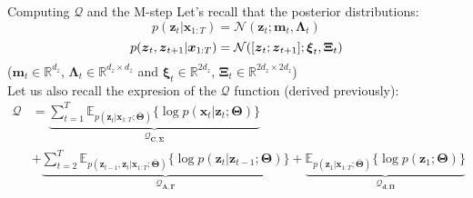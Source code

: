 \documentclass{beamer}
\newcommand{\MN}{{\mathcal N}}
\newcommand{\bs}[1]{\boldsymbol{#1}}
\begin{document}
\begin{frame}{Computing $\mathcal{Q}$ and the M-step}
Let's recall that the posterior distributions:
\begin{equation*}
 p(\bs{z}_t|\bs{x}_{1:T}) = \MN(\bs{z}_t;\bs{m}_t,\bs{\Lambda}_{t})
\end{equation*}
\begin{equation*}
 p(\bs{z}_t,\bs{z}_{t+1}|\bs{x}_{1:T}) = {\cal N}([\bs{z}_{t};\bs{z}_{t+1}]; \bs{\xi}_t,\bs{\Xi}_t)
\end{equation*}
{\small ($\bs{m}_t\in\mathbb{R}^{d_z}$, $\bs{\Lambda}_{t}\in\mathbb{R}^{d_z\times d_z}$ and $\bs{\xi}_t\in\mathbb{R}^{2d_z}$, $\bs{\Xi}_t\in\mathbb{R}^{2d_z\times2d_z}$)}\vspace{3mm}\\

Let us also recall the expresion of the $\mathcal{Q}$ function (derived previously):
  \begin{align*}
   \mathcal{Q} &= \underbrace{\sum_{t=1}^T \mathbb{E}_{p(\bs{z}_{t}|\bs{x}_{1:T};\bar{\bs{\Theta}})} \{\log p(\bs{x}_t|\bs{z}_t;\bs{\Theta})\}}_{\mathcal{Q}_{\bs{C},\bs{\Sigma}}}\\ &+ \underbrace{\sum_{t=2}^T\mathbb{E}_{p(\bs{z}_{t-1},\bs{z}_t|\bs{x}_{1:T};\bar{\bs{\Theta}})}\{ \log p(\bs{z}_t|\bs{z}_{t-1};\bs{\Theta})\}}_{\mathcal{Q}_{\bs{A},\bs{\Gamma}}} + \underbrace{\mathbb{E}_{p(\bs{z}_{1}|\bs{x}_{1:T};\bar{\bs{\Theta}})}\{\log p(\bs{z}_1;\bs{\Theta}) \}}_{\mathcal{Q}_{\bs{d},\bs{\Omega}}}
  \end{align*}
\end{frame}

\end{document}
